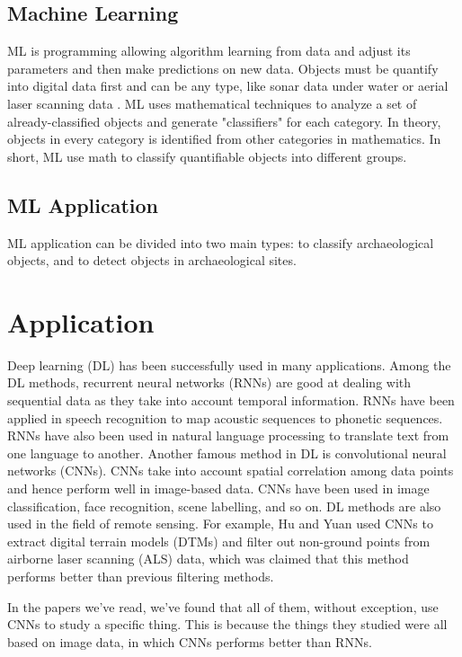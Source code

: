 \documentclass[journal]{IEEEtran}
\begin{document}
	\subsection{Machine Learning}
	
	ML is programming allowing algorithm learning from data and adjust its parameters and then make predictions on new data. Objects must be quantify into digital data first and can be any type, like sonar data under water\cite{Drap2018UnderwaterPF} or aerial
	laser scanning data \cite{rs10020225}. ML uses mathematical techniques to analyze a set of already-classified objects and generate "classifiers" for each category. In theory, objects in every category is identified from other categories in mathematics. In short, ML use math to classify quantifiable objects into different groups.\cite{bickler_2021}
	
	\subsection{ML Application}
	
	ML application can be divided into two main types: to classify archaeological objects, and to detect objects in archaeological sites.
	
	
	\section{Application}\label{application}

	Deep learning (DL) has been successfully used in many applications. Among the DL
	methods, recurrent neural networks (RNNs) are good at dealing with sequential data as they
	take into account temporal information. RNNs have been applied in speech recognition to
	map acoustic sequences to phonetic sequences. RNNs have also been used in natural
	language processing to translate text from one language to another. Another
	famous method in DL is convolutional neural networks (CNNs). CNNs take into
	account spatial correlation among data points and hence perform well in image-based data.
	CNNs have been used in image classification, face recognition,
	scene labelling, and so on. DL methods are also used in the field of remote sensing.
	For example, Hu and Yuan used CNNs to extract digital terrain models (DTMs) and filter out non-ground
	points from airborne laser scanning (ALS) data, which was claimed that this method performs better than
	previous filtering methods\cite{HuXiangyun2016DCfD}.

	In the papers we've read, we've found that all of them, without exception, use CNNs to study a specific thing.
	This is because the things they studied were all based on image data, in which CNNs performs better than RNNs.
\end{document}

